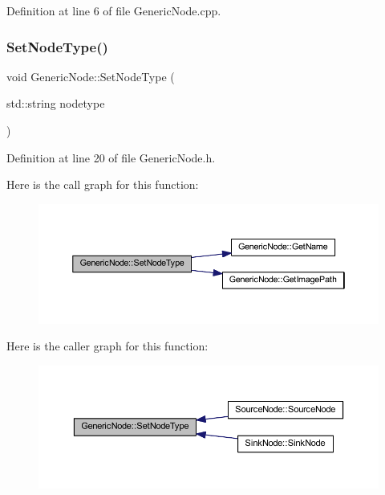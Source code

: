 Definition at line 6 of file Generic\+Node.\+cpp.

\mbox{\label{class_generic_node_ad05137b18cf33caa12d6c0d1293205c2}} 
\subsubsection{\texorpdfstring{Set\+Node\+Type()}{SetNodeType()}}
{\footnotesize\ttfamily void Generic\+Node\+::\+Set\+Node\+Type (\begin{DoxyParamCaption}\item[{std\+::string}]{nodetype }\end{DoxyParamCaption})\hspace{0.3cm}{\ttfamily [inline]}}



Definition at line 20 of file Generic\+Node.\+h.

Here is the call graph for this function\+:
\nopagebreak
\begin{figure}[H]
\begin{center}
\leavevmode
\includegraphics[width=350pt]{class_generic_node_ad05137b18cf33caa12d6c0d1293205c2_cgraph}
\end{center}
\end{figure}
Here is the caller graph for this function\+:
\nopagebreak
\begin{figure}[H]
\begin{center}
\leavevmode
\includegraphics[width=350pt]{class_generic_node_ad05137b18cf33caa12d6c0d1293205c2_icgraph}
\end{center}
\end{figure}
\mbox{\label{class_generic_node_a3b03496c103efe7e504f77e22abf851d}} 
